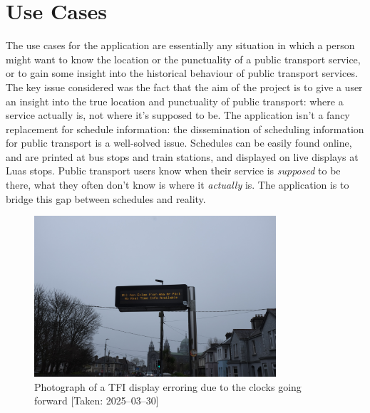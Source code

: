 \documentclass[a4paper,11pt]{report}
\begin{document}
\section{Use Cases}
The use cases for the application are essentially any situation in which a person might want to know the location or the punctuality of a public transport service, or to gain some insight into the historical behaviour of public transport services.
The key issue considered was the fact that the aim of the project is to give a user an insight into the true location and punctuality of public transport: where a service actually is, not where it's supposed to be.
The application isn't a fancy replacement for schedule information: the dissemination of scheduling information for public transport is a well-solved issue.
Schedules can be easily found online, and are printed at bus stops and train stations, and displayed on live displays at Luas stops.
Public transport users know when their service is \textit{supposed} to be there, what they often don't know is where it \textit{actually} is.
The application is to bridge this gap between schedules and reality.

\begin{figure}[H]
    \centering
    \includegraphics[width=0.8\textwidth]{./images/DSCF3477.JPG}
    \caption{Photograph of a TFI display erroring due to the clocks going forward [Taken: 2025--03--30]}
    \label{fig:tfierror}
\end{figure}
\end{document}
